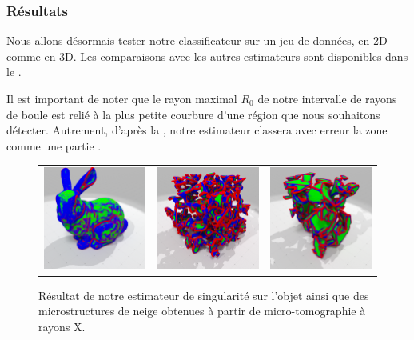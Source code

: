 \subsubsection{Résultats}%
\label{sec:applications:feature:II:results}
%
Nous allons désormais tester notre classificateur sur un jeu de données, en 2D comme en
3D. Les comparaisons avec les autres estimateurs sont disponibles dans le
.


Il est important de noter que le rayon maximal $R_0$ de notre intervalle de
rayons de boule est relié à la plus petite courbure d'une région \featsmooth
que nous souhaitons détecter. Autrement, d'après la
, notre estimateur classera avec erreur la zone
comme une partie \featflat.
%
%

\begin{figure}[ht]
  \begin{center}
    \setlength{\tabcolsep}{1pt}
    \begin{tabular}{c c c}
      \includegraphics[width=4cm]{images/Feature/Bunny_512_II_scale} &
      \includegraphics[width=4cm]{images/Feature/Snow_I08_II_scale} &
      \includegraphics[width=4cm]{images/Feature/Snow_E2bis_II_scale} \\
    \end{tabular}
    \caption{Résultat de notre estimateur de singularité sur l'objet \Bunny ainsi que des microstructures de neige obtenues à partir de micro-tomographie à rayons X.\label{fig:feature-snow}}
  \end{center}
\end{figure}

